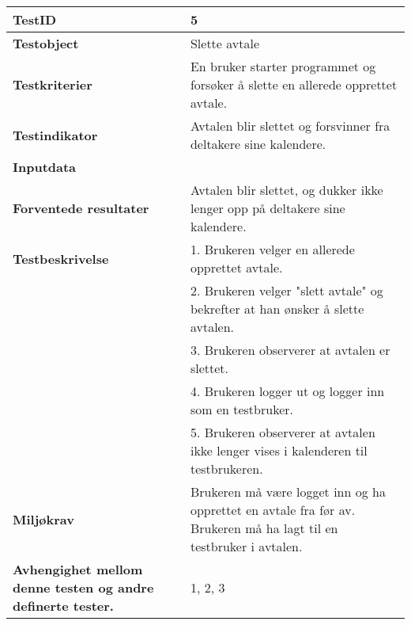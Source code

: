 	\begin{tabularx}{1.2\textwidth}{| p{5cm} | X |}
	\hline
	\textbf{TestID} 																& 5																	\\ \hline
	\textbf{Testobject} 															& Slette avtale															\\ \hline
	\textbf{Testkriterier} 															& En bruker starter programmet og forsøker å slette en allerede opprettet avtale.			\\ \hline
	\textbf{Testindikator} 															& Avtalen blir slettet og forsvinner fra deltakere sine kalendere.						\\ \hline
	\textbf{Inputdata} 															& 													\\  \hline
	\textbf{Forventede resultater}									 				& Avtalen blir slettet, og dukker ikke lenger opp på deltakere sine kalendere.				\\ \hline
	\textbf{Testbeskrivelse} 														& 1. Brukeren velger en allerede opprettet avtale.\\
																			& 2. Brukeren velger "slett avtale" og bekrefter at han ønsker å slette avtalen.\\
																			& 3. Brukeren observerer at avtalen er slettet.\\
																			& 4. Brukeren logger ut og logger inn som en testbruker.\\
																			& 5. Brukeren observerer at avtalen ikke lenger vises i kalenderen til testbrukeren.				\\ \hline
	\textbf{Miljøkrav}			 												& Brukeren må være logget inn og ha opprettet en avtale fra før av. Brukeren må ha lagt til en testbruker i avtalen.						\\ \hline
	\textbf{Avhengighet mellom denne testen og andre definerte tester.}		 				& 1, 2, 3				 													\\ \hline
	\end{tabularx}

\mbox{}\\

